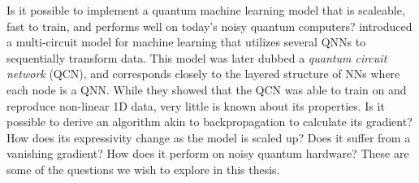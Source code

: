 Is it possible to implement a quantum machine learning model that is scaleable, fast to train, and performs well on today's noisy quantum computers? \citet{stian} introduced a multi-circuit model for machine learning that utilizes several QNNs to sequentially transform data. This model was later dubbed a \emph{quantum circuit network} (QCN), and corresponds closely to the layered structure of NNs where each node is a QNN. While they showed that the QCN was able to train on and reproduce non-linear 1D data, very little is known about its properties. Is it possible to derive an algorithm akin to backpropagation to calculate its gradient? How does its expressivity change as the model is scaled up? Does it suffer from a vanishing gradient? How does it perform on noisy quantum hardware? These are some of the questions we wish to explore in this thesis.


